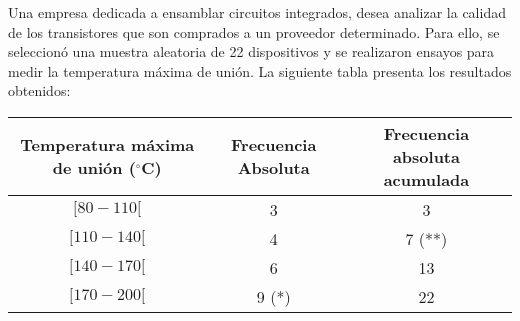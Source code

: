 \addpoints
\question[15]  Una empresa dedicada a ensamblar circuitos integrados, desea analizar la calidad de los transistores que son comprados a un proveedor determinado. Para ello, se seleccionó una muestra aleatoria de 22 dispositivos y se realizaron ensayos para medir la temperatura máxima de unión. La siguiente tabla presenta los resultados obtenidos:
\begin{table}[h!]
\centering
\begin{tabular}{|c|c|c|}
\hline
Temperatura máxima de unión ($^{\circ}$C) & Frecuencia Absoluta & Frecuencia absoluta acumulada \\ \hline
$[80-110[$                       & 3                   & 3                             \\ \hline
$[110-140[$                      & 4                   & 7 (**)                        \\ \hline
$[140-170[$                      & 6                   & 13                            \\ \hline
$[170-200[$                      & 9 (*)               & 22                            \\ \hline
\end{tabular}
\end{table}
\noaddpoints
{}

